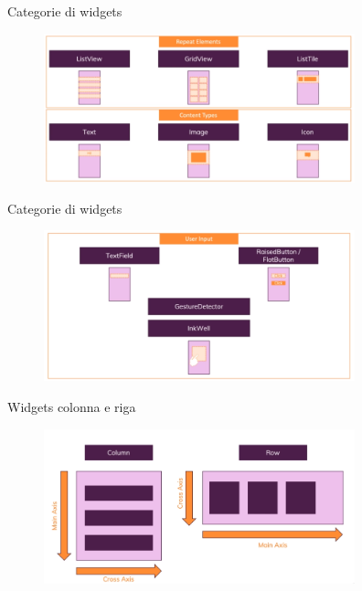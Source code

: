 \documentclass{../libs/presentation_format}
\begin{document}

\begin{frame}{Categorie di widgets}
	\begin{figure}[htpb]
		\centering
		\includegraphics[width=9cm]{../libs/widget-categories-4}
	\end{figure}
\end{frame}


\begin{frame}{Categorie di widgets}
	\begin{figure}[htpb]
		\centering
		\includegraphics[width=9cm]{../libs/widget-categories-5}
	\end{figure}
\end{frame}


\begin{frame}{Widgets colonna e riga}
	\begin{figure}[htpb]
		\centering
		\includegraphics[width=9cm]{../libs/row-column-widgets}
	\end{figure}
\end{frame}
\end{document}
